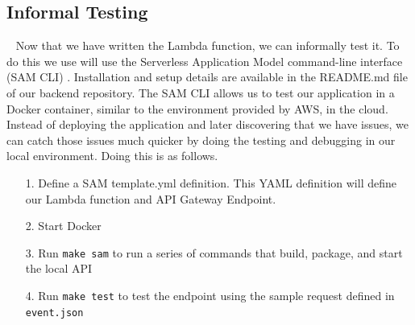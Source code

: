 \documentclass[10pt, a4paper]{article}
\begin{document}
\subsection{Informal Testing}
\par ~ Now that we have written the Lambda function, we can informally test it. To do this we use will use the Serverless Application Model command-line interface (SAM CLI) \cite{three}. Installation and setup details are available in the README.md file of our backend repository. The SAM CLI allows us to test our application in a Docker container, similar to the environment provided by AWS, in the cloud. Instead of deploying the application and later discovering that we have issues, we can catch those issues much quicker by doing the testing and debugging in our local environment. Doing this is as follows.

\begin{enumerate}
	\item[1.] Define a SAM template.yml definition. This YAML definition will define our Lambda function and API Gateway Endpoint.
	\item[2.] Start Docker
	\item[3.] Run \texttt{make sam} to run a series of commands that build, package, and start the local API
	\item[4.] Run \texttt{make test} to test the endpoint using the sample request defined in \texttt{event.json}
\end{enumerate}
\end{document}
